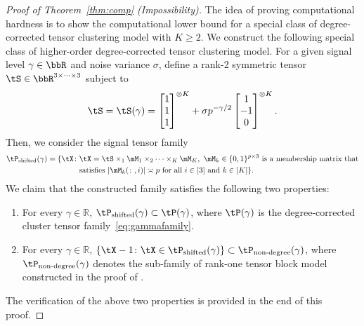\documentclass[lettersize,onecolumn,journal]{IEEEtran}
\theoremstyle{definition}
\theoremstyle{definition}
\begin{document}
\begin{proof}[Proof of Theorem~\ref{thm:comp} (Impossibility)]
The idea of proving computational hardness is to show the computational lower bound for a special class of degree-corrected tensor clustering model with $K\geq 2$. We construct the following special class of higher-order degree-corrected tensor clustering  model. For a given signal level $\gamma\in\bbR$ and noise variance $\sigma$, define a rank-2 symmetric tensor $\tS\in\bbR^{3\times \cdots\times 3}$ subject to
\begin{equation}\label{eq:S}
\tS=\tS(\gamma) = \begin{bmatrix}
		1\\
		1\\
		1
		\end{bmatrix}^{\otimes K}
+\sigma p^{-\gamma/2} \begin{bmatrix}
		1\\
		-1\\
		0
	\end{bmatrix}^{\otimes K}.
\end{equation}
Then, we consider the signal tensor family
\begin{align}
\tP_{\text{shifted}}(\gamma)=\{\tX\colon & \tX=\tS\times_1\mM_1\times_2 \cdots \times_K\mM_K,\  \text{$\mM_k\in\{0,1\}^{p\times 3}$ is a membership matrix that}
\\
& \text{satisfies $|\mM_k(\colon,i)|\asymp p$ for all $i\in[3]$ and $k\in[K]$}\}.
\end{align}
We claim that the constructed family satisfies the following two properties:
\begin{enumerate}[wide,label=(\roman*)]
    \item For every $\gamma\in \mathbb{R}$, $\tP_{\text{shifted}}(\gamma)\subset \tP(\gamma)$, where $\tP(\gamma)$ is the degree-corrected cluster tensor family~\eqref{eq:gammafamily}.
    \item For every $\gamma\in \mathbb{R}$, $\{\tX-1\colon \tX\in \tP_{\text{shifted}}(\gamma)\}\subset \tP_{\text{non-degree}}(\gamma)$, where $\tP_{\text{non-degree}}(\gamma)$ denotes the sub-family of rank-one tensor block model constructed in the proof of \citet[Theorem 7]{han2020exact}. 
\end{enumerate}
The verification of the above two properties is provided in the end of this proof. 


\end{proof}
\end{document}

